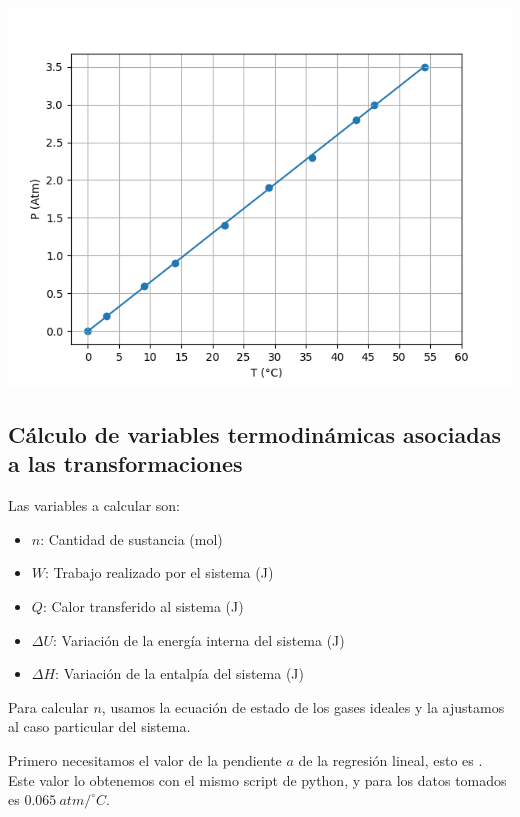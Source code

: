 \documentclass{article}
\begin{document}
\includegraphics[scale=0.8]{plot-1.png}


\subsection*{Cálculo de variables termodinámicas asociadas a las transformaciones}


Las variables a calcular son:

\begin{itemize}
    \item  $n$: Cantidad de sustancia (mol)
    \item  $W$: Trabajo realizado por el sistema (J)
    \item  $Q$: Calor transferido al sistema (J)
    \item  $\Delta U$: Variación de la energía interna del sistema (J)
    \item  $\Delta H$: Variación de la entalpía del sistema (J)\\
\end{itemize}

\newpage

Para calcular $n$, usamos la ecuación de estado de los gases ideales y la ajustamos al caso particular del sistema.

Primero necesitamos el valor de la pendiente $a$ de la regresión lineal, esto es .\\

Este valor lo obtenemos con el mismo script de python, y para los datos tomados es $0.065\ atm/^\circ{C}$.
\end{document}
